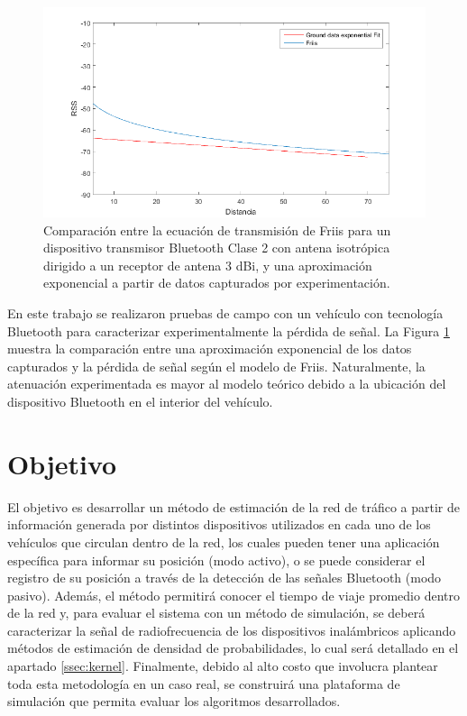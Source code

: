 \begin{figure}[!htp]
\centering
\includegraphics[scale=0.6]{images/friis-ground.png}
\captionsetup{width=.7\linewidth}
\caption{Comparación entre la ecuación de transmisión de Friis para un dispositivo transmisor Bluetooth Clase 2 con antena isotrópica dirigido a un receptor de antena 3 dBi, y una aproximación exponencial a partir de datos capturados por experimentación.}
\label{fig:friis-ground}
\end{figure}

En este trabajo se realizaron pruebas de campo con un vehículo con tecnología Bluetooth para caracterizar experimentalmente la pérdida de señal. La Figura \ref{fig:friis-ground} muestra la comparación entre una aproximación exponencial de los datos capturados y la pérdida de señal según el modelo de Friis. Naturalmente, la atenuación experimentada es mayor al modelo teórico debido a la ubicación del dispositivo Bluetooth en el interior del vehículo.

\section{Objetivo}
\label{sec:objetivo}

El objetivo es desarrollar un método de estimación de la red de tráfico a partir de información generada por distintos dispositivos utilizados en cada uno de los vehículos que circulan dentro de la red, los cuales pueden tener una aplicación específica para informar su posición (modo activo), o se puede considerar el registro de su posición a través de la detección de las señales Bluetooth (modo pasivo). Además, el método permitirá conocer el tiempo de viaje promedio dentro de la red y, para evaluar el sistema con un método de simulación, se deberá caracterizar la señal de radiofrecuencia de los dispositivos inalámbricos aplicando métodos de estimación de densidad de probabilidades, lo cual será detallado en el apartado \ref{ssec:kernel}. Finalmente, debido al alto costo que involucra plantear toda esta metodología en un caso real, se construirá una plataforma de simulación que permita evaluar los algoritmos desarrollados.


